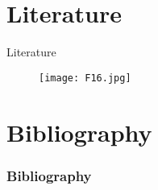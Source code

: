 \documentclass[pdflatex,compress,10pt,
	xcolor={dvipsnames,dvipsnames,svgnames,x11names,table},
	hyperref={
	breaklinks = true, 
	pdfauthor={Lemenkova Polina}, 
	pdfsubject={Preentation}, 
	pdfcreator={Lemenkova Polina}, 
	pdfproducer={Lemenkova Polina}, 
	citecolor=NavyBlue, 
	urlcolor = NavyBlue, 
	breaklinks = true}]{beamer}
\begin{document}
\section{Literature}
\begin{frame}{Literature}
\begin{figure}[H]
	\centering
		\texttt{[image: F16.jpg]}
\end{figure}
\end{frame}


\section{Bibliography}
\begin{frame}[allowframebreaks]\frametitle{Bibliography}
	\nocite{*}
	\printbibliography[heading=none]
\end{frame}


\end{document}
